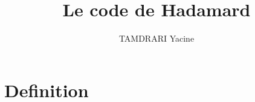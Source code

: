 \documentclass{article}
\author{TAMDRARI Yacine}
\title{Le code de Hadamard}
\begin{document}
\maketitle

\section{Definition}
\end{document}
